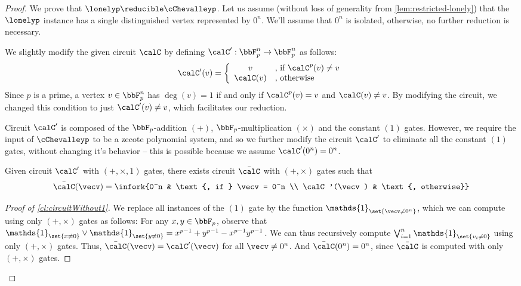 \begin{proof}    We prove that $\lonelyp \reducible \cChevalleyp$. Let us assume (without loss of
    generality from \autoref{lem:restricted-lonely}) that the $\lonelyp$
    instance has a single distinguished vertex represented by $0^n$. We'll assume that $0^n$ is isolated, otherwise, no further reduction is necessary.\medskip

     We slightly
    modify the given circuit $\calC$ by defining
    $\calC': \bbF_p^n \to \bbF_p^n$ as follows:
    \[ \calC'(v) = \left\{
                \begin{array}{cl}
                  v         &     \text{, if } \calC^p(v) \neq v \\
                  \calC(v)  &     \text{, otherwise}
                \end{array}
                \right.
    \]
    Since $p$ is a prime, a vertex $v \in \bbF_p^n$ has $\deg(v) = 1$ if and only if
    $\calC^p(v) = v$ and $\calC(v) \neq v$. By modifying the circuit, we changed this
    condition to just $\calC'(v) \neq v$, which facilitates our reduction.

    Circuit
    $\calC'$ is composed of the $\bbF_p$-addition $(+)$, $\bbF_p$-multiplication $(\times)$
    and the constant $(1)$ gates. However, we require the input of $\cChevalleyp$ to be a
    zecote polynomial system, and so we further modify the circuit $\calC'$ to eliminate all the constant $(1)$ gates, without changing it's behavior -- this is possible because we assume $\calC'(0^n) = 0^n$.
                \begin{claim}
        \label{cl:circuitWithout1}
          Given circuit $\calC'$ with $(+,\times, 1)$ gates, there exists circuit
          $\bar{\calC}$ with $(+, \times)$ gates such that
          \[ \bar{\calC}(\vecv) = \infork{0^n & \text{, if } \vecv = 0^n \\ \calC'(\vecv) & \text{, otherwise}}
          \]
    \end{claim}
    \begin{proof}[Proof of \autoref{cl:circuitWithout1}]
    	We replace all instances of the $(1)$ gate by the function $\mathds{1}_{\set{\vecv \ne 0^n}}$, which we can compute using only $(+, \times)$ gates as follows: For any $x, y \in \bbF_p$, observe that $\mathds{1}_{\set{x \ne 0}} \vee \mathds{1}_{\set{y \ne 0}} = x^{p-1} + y^{p-1} - x^{p-1} y^{p-1}$. We can thus recursively compute $\bigvee_{i=1}^n \mathds{1}_{\set{v_i \ne 0}}$ using only $(+, \times)$ gates. Thus, $\bar{\calC}(\vecv) = \calC'(\vecv)$ for all $\vecv \ne 0^n$. And $\bar{\calC}(0^n) = 0^n$, since $\bar{\calC}$ is computed with only $(+, \times)$ gates.
    \end{proof}


\end{proof}

